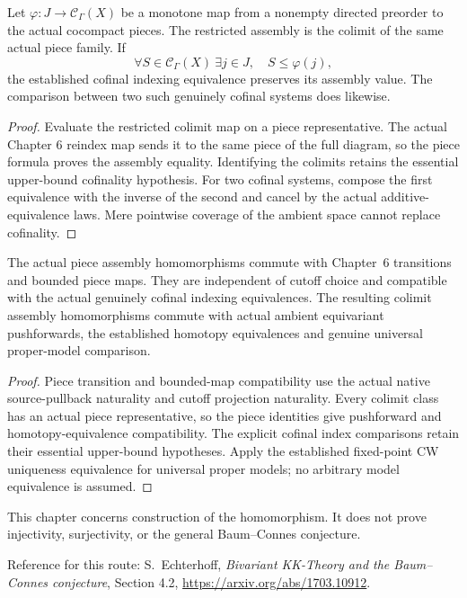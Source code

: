 \begin{proposition}\label{prop:assembly-cofinal-index}
\leanok
Let $\varphi:J\to\mathcal C_\Gamma(X)$ be a monotone map from a nonempty
directed preorder to the actual cocompact pieces. The restricted assembly is
the colimit of the same actual piece family. If
\[
 \forall S\in\mathcal C_\Gamma(X)\ \exists j\in J,\quad S\leq\varphi(j),
\]
the established cofinal indexing equivalence preserves its assembly value.
The comparison between two such genuinely cofinal systems does likewise.
\end{proposition}
\begin{proof}
\leanok
Evaluate the restricted colimit map on a piece representative. The actual
Chapter 6 reindex map sends it to the same piece of the full diagram, so the
piece formula proves the assembly equality. Identifying the colimits retains
the essential upper-bound cofinality hypothesis. For two cofinal systems,
compose the first equivalence with the inverse of the second and cancel by
the actual additive-equivalence laws. Mere pointwise coverage of the ambient
space cannot replace cofinality.
\end{proof}


\begin{proposition}\label{prop:assembly-compatibility}
\leanok
The actual piece assembly homomorphisms commute with Chapter~6 transitions
and bounded piece maps. They are independent of cutoff choice and compatible
with the actual genuinely cofinal indexing equivalences. The resulting colimit
assembly homomorphisms commute with actual ambient equivariant pushforwards,
the established homotopy equivalences and genuine universal proper-model
comparison.
\end{proposition}
\begin{proof}
\leanok
Piece transition and bounded-map compatibility use the actual native
source-pullback naturality and cutoff projection naturality. Every colimit
class has an actual piece representative, so the piece identities give
pushforward and homotopy-equivalence compatibility. The explicit cofinal
index comparisons retain their essential upper-bound hypotheses. Apply the
established fixed-point CW uniqueness equivalence for universal proper
models; no arbitrary model equivalence is assumed.
\end{proof}



This chapter concerns construction of the homomorphism. It does not prove
injectivity, surjectivity, or the general Baum--Connes conjecture.

Reference for this route: S.~Echterhoff, \emph{Bivariant KK-Theory and the
Baum--Connes conjecture}, Section 4.2,
\url{https://arxiv.org/abs/1703.10912}.
